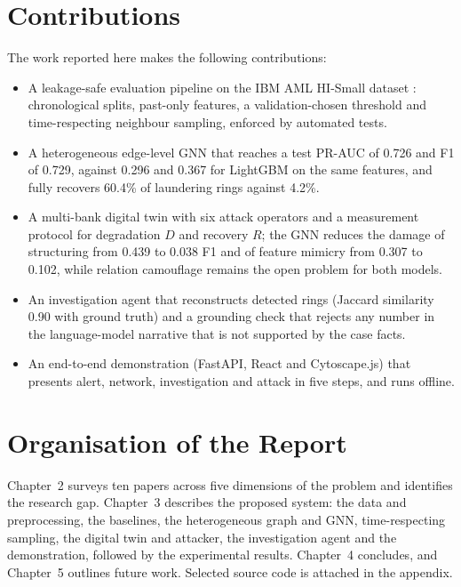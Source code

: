 \section{Contributions}
The work reported here makes the following contributions:
\begin{itemize}
    \item A leakage-safe evaluation pipeline on the IBM AML HI-Small dataset \cite{altman2023realistic}: chronological splits, past-only features, a validation-chosen threshold and time-respecting neighbour sampling, enforced by automated tests.
    \item A heterogeneous edge-level GNN that reaches a test PR-AUC of 0.726 and F1 of 0.729, against 0.296 and 0.367 for LightGBM on the same features, and fully recovers 60.4\% of laundering rings against 4.2\%.
    \item A multi-bank digital twin with six attack operators and a measurement protocol for degradation $D$ and recovery $R$; the GNN reduces the damage of structuring from 0.439 to 0.038 F1 and of feature mimicry from 0.307 to 0.102, while relation camouflage remains the open problem for both models.
    \item An investigation agent that reconstructs detected rings (Jaccard similarity 0.90 with ground truth) and a grounding check that rejects any number in the language-model narrative that is not supported by the case facts.
    \item An end-to-end demonstration (FastAPI, React and Cytoscape.js) that presents alert, network, investigation and attack in five steps, and runs offline.
\end{itemize}

\section{Organisation of the Report}
Chapter~2 surveys ten papers across five dimensions of the problem and identifies the research gap. Chapter~3 describes the proposed system: the data and preprocessing, the baselines, the heterogeneous graph and GNN, time-respecting sampling, the digital twin and attacker, the investigation agent and the demonstration, followed by the experimental results. Chapter~4 concludes, and Chapter~5 outlines future work. Selected source code is attached in the appendix.
